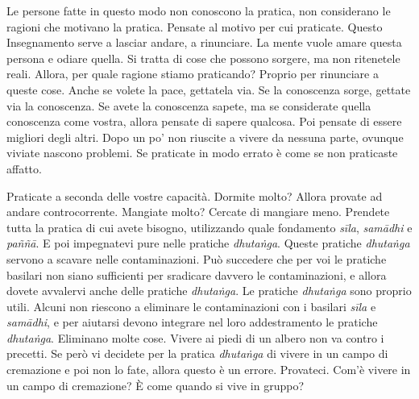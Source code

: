 Le persone fatte in questo modo non conoscono la pratica, non
considerano le ragioni che motivano la pratica. Pensate al motivo per
cui praticate. Questo Insegnamento serve a lasciar andare, a rinunciare.
La mente vuole amare questa persona e odiare quella. Si tratta di cose
che possono sorgere, ma non ritenetele reali. Allora, per quale ragione
stiamo praticando? Proprio per rinunciare a queste cose. Anche se volete
la pace, gettatela via. Se la conoscenza sorge, gettate via la
conoscenza. Se avete la conoscenza sapete, ma se considerate quella
conoscenza come vostra, allora pensate di sapere qualcosa. Poi pensate
di essere migliori degli altri. Dopo un po' non riuscite a vivere da
nessuna parte, ovunque viviate nascono problemi. Se praticate in modo
errato è come se non praticaste affatto.

Praticate a seconda delle vostre capacità. Dormite molto? Allora provate
ad andare controcorrente. Mangiate molto? Cercate di mangiare meno.
Prendete tutta la pratica di cui avete bisogno, utilizzando quale
fondamento \emph{sīla}, \emph{samādhi} e \emph{paññā}. E poi impegnatevi
pure nelle pratiche \emph{dhutaṅga}. Queste pratiche \emph{dhutaṅga}
servono a scavare nelle contaminazioni. Può succedere che per voi le
pratiche basilari non siano sufficienti per sradicare davvero le
contaminazioni, e allora dovete avvalervi anche delle pratiche
\emph{dhutaṅga}. Le pratiche \emph{dhutaṅga} sono proprio utili. Alcuni
non riescono a eliminare le contaminazioni con i basilari \emph{sīla} e
\emph{samādhi}, e per aiutarsi devono integrare nel loro addestramento
le pratiche \emph{dhutaṅga}. Eliminano molte cose. Vivere ai piedi di un
albero non va contro i precetti. Se però vi decidete per la pratica
\emph{dhutaṅga} di vivere in un campo di cremazione e poi non lo fate,
allora questo è un errore. Provateci. Com'è vivere in un campo di
cremazione? È come quando si vive in gruppo?

